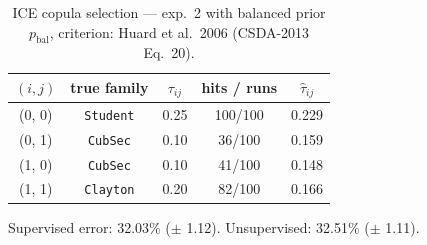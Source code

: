 \begin{table}[htbp]
  \centering
  \caption{ICE copula selection — exp.\ 2 with balanced prior $p_{\text{bal}}$, criterion: Huard et al.\ 2006 (CSDA-2013 Eq.\ 20).}
  \label{tab:exp3-exp2_bal_p__huard}
  \begin{tabular}{ccccc}
    \toprule
    $(i, j)$ & true family & $\tau_{ij}$ & hits / runs & $\hat\tau_{ij}$ \\
    \midrule
    (0, 0) & \texttt{Student} & 0.25 & 100/100 & 0.229 \\
    (0, 1) & \texttt{CubSec} & 0.10 & 36/100 & 0.159 \\
    (1, 0) & \texttt{CubSec} & 0.10 & 41/100 & 0.148 \\
    (1, 1) & \texttt{Clayton} & 0.20 & 82/100 & 0.166 \\
    \bottomrule
  \end{tabular}
  \par\smallskip Supervised error: 32.03\% ($\pm$ 1.12). Unsupervised: 32.51\% ($\pm$ 1.11).
\end{table}
